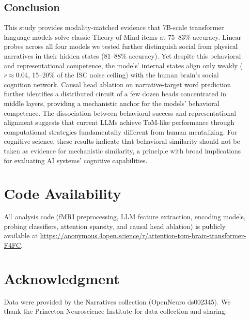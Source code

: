 \documentclass[conference]{IEEEtran}
\begin{document}
\subsection{Conclusion}

This study provides modality-matched evidence that 7B-scale transformer language models solve classic Theory of Mind items at 75--83\% accuracy. Linear probes across all four models we tested further distinguish social from physical narratives in their hidden states (81--88\% accuracy). Yet despite this behavioral and representational competence, the models' internal states align only weakly ($r \approx 0.04$, 15--20\% of the ISC noise ceiling) with the human brain's social cognition network. Causal head ablation on narrative-target word prediction further identifies a distributed circuit of a few dozen heads concentrated in middle layers, providing a mechanistic anchor for the models' behavioral competence. The dissociation between behavioral success and representational alignment suggests that current LLMs achieve ToM-like performance through computational strategies fundamentally different from human mentalizing. For cognitive science, these results indicate that behavioral similarity should not be taken as evidence for mechanistic similarity, a principle with broad implications for evaluating AI systems' cognitive capabilities.

\section*{Code Availability}

All analysis code (fMRI preprocessing, LLM feature extraction, encoding models, probing classifiers, attention sparsity, and causal head ablation) is publicly available at \url{https://anonymous.4open.science/r/attention-tom-brain-transformer-F4FC}.

\section*{Acknowledgment}

Data were provided by the Narratives collection \cite{nastase2021narratives} (OpenNeuro ds002345). We thank the Princeton Neuroscience Institute for data collection and sharing.
\end{document}
